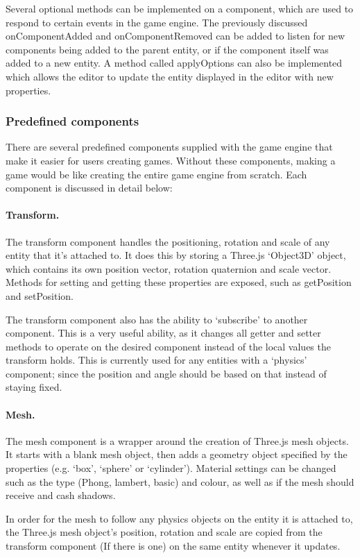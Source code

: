 	Several optional methods can be implemented on a component, which are used to respond to certain events in the game engine. The previously discussed onComponentAdded and onComponentRemoved can be added to listen for new components being added to the parent entity, or if the component itself was added to a new entity. A method called applyOptions can also be implemented which allows the editor to update the entity displayed in the editor with new properties.

	\subsubsection{Predefined components}
	There are several predefined components supplied with the game engine that make it easier for users creating games. Without these components, making a game would be like creating the entire game engine from scratch. Each component is discussed in detail below:

	\paragraph{Transform.}
	The transform component handles the positioning, rotation and scale of any entity that it's attached to. It does this by storing a Three.js `Object3D' object, which contains its own position vector, rotation quaternion and scale vector. Methods for setting and getting these properties are exposed, such as getPosition and setPosition. 

	The transform component also has the ability to `subscribe' to another component. This is a very useful ability, as it changes all getter and setter methods to operate on the desired component instead of the local values the transform holds. This is currently used for any entities with a `physics' component; since the position and angle should be based on that instead of staying fixed.

	\paragraph{Mesh.}
	The mesh component is a wrapper around the creation of Three.js mesh objects. It starts with a blank mesh object, then adds a geometry object specified by the properties (e.g. `box', `sphere' or `cylinder'). Material settings can be changed such as the type (Phong, lambert, basic) and colour, as well as if the mesh should receive and cash shadows.

	In order for the mesh to follow any physics objects on the entity it is attached to, the Three.js mesh object's position, rotation and scale are copied from the transform component (If there is one) on the same entity whenever it updates.

